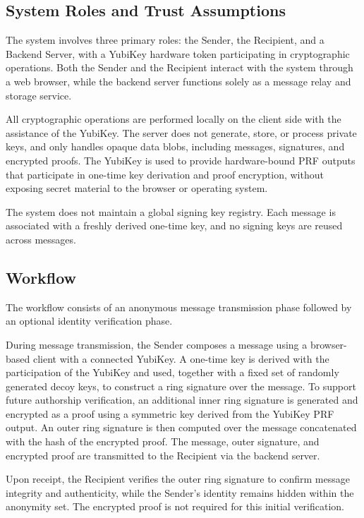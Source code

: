\documentclass[letterpaper,11pt]{article}
\begin{document}
\subsection{System Roles and Trust Assumptions}
The system involves three primary roles: the Sender, the Recipient, and a Backend Server, with a YubiKey hardware token participating in cryptographic operations. Both the Sender and the Recipient interact with the system through a web browser, while the backend server functions solely as a message relay and storage service.

All cryptographic operations are performed locally on the client side with the assistance of the YubiKey. The server does not generate, store, or process private keys, and only handles opaque data blobs, including messages, signatures, and encrypted proofs. The YubiKey is used to provide hardware-bound PRF outputs that participate in one-time key derivation and proof encryption, without exposing secret material to the browser or operating system.

The system does not maintain a global signing key registry. Each message is associated with a freshly derived one-time key, and no signing keys are reused across messages.

\subsection{Workflow}
The workflow consists of an anonymous message transmission phase followed by an optional identity verification phase.

During message transmission, the Sender composes a message using a browser-based client with a connected YubiKey. A one-time key is derived with the participation of the YubiKey and used, together with a fixed set of randomly generated decoy keys, to construct a ring signature over the message. To support future authorship verification, an additional inner ring signature is generated and encrypted as a proof using a symmetric key derived from the YubiKey PRF output. An outer ring signature is then computed over the message concatenated with the hash of the encrypted proof. The message, outer signature, and encrypted proof are transmitted to the Recipient via the backend server.

Upon receipt, the Recipient verifies the outer ring signature to confirm message integrity and authenticity, while the Sender’s identity remains hidden within the anonymity set. The encrypted proof is not required for this initial verification.
\end{document}
